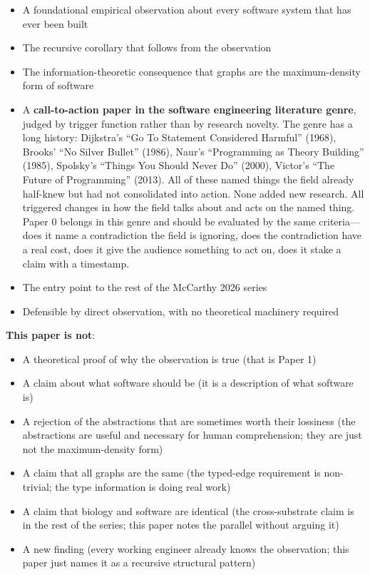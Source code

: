 \documentclass[11pt]{article}
\begin{document}
\begin{itemize}[leftmargin=*]
\item A foundational empirical observation about every software system that has ever been built
\item The recursive corollary that follows from the observation
\item The information-theoretic consequence that graphs are the maximum-density form of software
\item A \textbf{call-to-action paper in the software engineering literature genre}, judged by trigger function rather than by research novelty. The genre has a long history: Dijkstra's ``Go To Statement Considered Harmful'' (1968), Brooks' ``No Silver Bullet'' (1986), Naur's ``Programming as Theory Building'' (1985), Spolsky's ``Things You Should Never Do'' (2000), Victor's ``The Future of Programming'' (2013). All of these named things the field already half-knew but had not consolidated into action. None added new research. All triggered changes in how the field talks about and acts on the named thing. Paper 0 belongs in this genre and should be evaluated by the same criteria---does it name a contradiction the field is ignoring, does the contradiction have a real cost, does it give the audience something to act on, does it stake a claim with a timestamp.
\item The entry point to the rest of the McCarthy 2026 series
\item Defensible by direct observation, with no theoretical machinery required
\end{itemize}

\textbf{This paper is not}:

\begin{itemize}[leftmargin=*]
\item A theoretical proof of why the observation is true (that is Paper 1)
\item A claim about what software should be (it is a description of what software is)
\item A rejection of the abstractions that are sometimes worth their lossiness (the abstractions are useful and necessary for human comprehension; they are just not the maximum-density form)
\item A claim that all graphs are the same (the typed-edge requirement is non-trivial; the type information is doing real work)
\item A claim that biology and software are identical (the cross-substrate claim is in the rest of the series; this paper notes the parallel without arguing it)
\item A new finding (every working engineer already knows the observation; this paper just names it as a recursive structural pattern)
\end{itemize}
\end{document}
